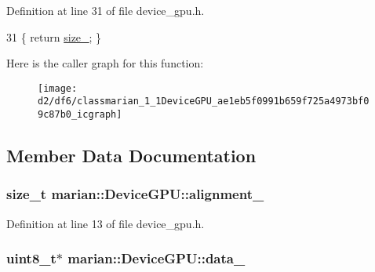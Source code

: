 Definition at line 31 of file device\+\_\+gpu.\+h.


\begin{DoxyCode}
31 \{ \textcolor{keywordflow}{return} \hyperlink{classmarian_1_1DeviceGPU_a7c218fa5b3219556c87956c046a0e33a}{size\_}; \}
\end{DoxyCode}


Here is the caller graph for this function\+:
\nopagebreak
\begin{figure}[H]
\begin{center}
\leavevmode
\texttt{[image: d2/df6/classmarian\_1\_1DeviceGPU\_ae1eb5f0991b659f725a4973bf09c87b0\_icgraph]}
\end{center}
\end{figure}




\subsection{Member Data Documentation}
\subsubsection[{\texorpdfstring{alignment\+\_\+}{alignment_}}]{\setlength{\rightskip}{0pt plus 5cm}size\+\_\+t marian\+::\+Device\+G\+P\+U\+::alignment\+\_\+\hspace{0.3cm}{\ttfamily [private]}}\hypertarget{classmarian_1_1DeviceGPU_a02173fc47bf190cb675cf1ec7a4a7827}{}\label{classmarian_1_1DeviceGPU_a02173fc47bf190cb675cf1ec7a4a7827}


Definition at line 13 of file device\+\_\+gpu.\+h.

\subsubsection[{\texorpdfstring{data\+\_\+}{data_}}]{\setlength{\rightskip}{0pt plus 5cm}uint8\+\_\+t$\ast$ marian\+::\+Device\+G\+P\+U\+::data\+\_\+\hspace{0.3cm}{\ttfamily [private]}}\hypertarget{classmarian_1_1DeviceGPU_a085bcc3d04ff42149b473571be4e41bf}{}\label{classmarian_1_1DeviceGPU_a085bcc3d04ff42149b473571be4e41bf}


